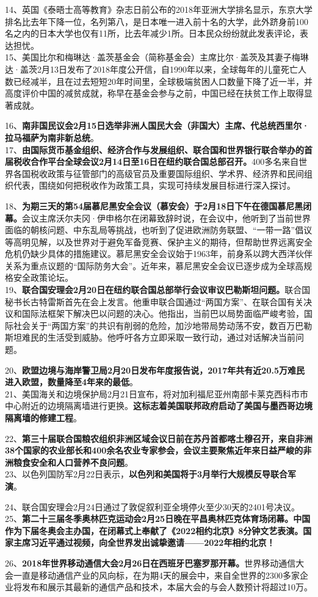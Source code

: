 14、英国《泰晤士高等教育》杂志日前公布的2018年亚洲大学排名显示，东京大学排名比去年下降一位，名列第八，是日本唯一进入前十名的大学，此外跻身前100名之内的日本大学也仅有11所，比去年减少1所。日本民众纷纷就此发表评论，表达担忧。\\
15、美国比尔和梅琳达·盖茨基金会（简称基金会）主席比尔·盖茨及其妻子梅琳达·盖茨2月13日发布了2018年度公开信，自1990年以来，全球每年的儿童死亡人数已经减半，且在过去短短20年时间里，全球极端贫困人口数量下降了近一半，并高度评价中国的减贫成就，称早在基金会参与之前，中国已经在扶贫工作上取得显著成就。

16、{\textbf{南非国民议会2月15日选举非洲人国民大会（非国大）主席、代总统西里尔·拉马福萨为南非新总统}}。\\
17、{\textbf{由国际货币基金组织、经济合作与发展组织、联合国和世界银行联合举办的首届税收合作平台全球会议2月14日至16日在纽约联合国总部召开。}}400多名来自世界各国税收政策与征管部门的高级官员及重要国际组织、学术界、经济界和民间组织代表，围绕如何把税收作为政策工具，实现可持续发展目标进行深入探讨。

18、{\textbf{为期三天的第54届慕尼黑安全会议（慕安会）于2月18日下午在德国慕尼黑闭幕。}}会议主席沃尔夫冈·伊申格尔在闭幕致辞时说，在会议中，他听到了当前世界面临的朝核问题、中东乱局等挑战，也听到了促进欧洲防务联盟、``一带一路''倡议等高明见解，以及世界对于避免军备竞赛、保护主义的期待，但帮助世界远离安全危机仍缺少具体的措施建议。慕尼黑安全会议始于1963年，前身系以跨大西洋伙伴关系为重点议题的``国际防务大会''。近年来，慕尼黑安全会议已逐步成为全球高规格安全政策论坛。\\
19、{\textbf{联合国安理会2月20日在纽约联合国总部举行会议审议巴勒斯坦问题。}}联合国秘书长古特雷斯首先在会上发言。他重申联合国通过``两国方案''、在联合国有关决议和国际法框架下解决巴以问题的决心。他指出，当前巴以局势面临严峻考验，国际社会关于``两国方案''的共识有削弱的危险，加沙地带局势动荡不安，数百万巴勒斯坦难民的生活受到威胁。他呼吁各方立即采取一致行动，通过对话解决当前问题。

20、{\textbf{欧盟边境与海岸警卫局2月20日发布年度报告说，2017年共有近20.5万难民进入欧盟，数量降至4年来的最低}}。\\
21、美国海关和边境保护局2月21日宣布，将对加利福尼亚州南部卡莱克西科市市中心附近的边境隔离墙进行更换。{\textbf{这标志着美国联邦政府启动了美国与墨西哥边境隔离墙的修建工程}}。

22、{\textbf{第三十届联合国粮农组织非洲区域会议日前在苏丹首都喀土穆召开，来自非洲38个国家的农业部长和400余名农业专家参会，会议主要聚焦近年来日益严峻的非洲粮食安全和人口营养不良问题}}。\\
23、以色列国防军2月22日表示，{\textbf{以色列和美国将于3月举行大规模反导联合军演}}。

24、联合国安理会2月24日通过了敦促叙利亚全境停火至少30天的2401号决议。\\
25、{\textbf{第二}}{\textbf{十三届冬季奥林匹克运动会2月25日晚在平昌奥林匹克体育场闭幕。中国作为下届冬奥会主办国，在闭幕式上奉献了《2022相约北京》8分钟文艺表演。国家主席习近平通过视频，向全世界发出诚挚邀请------2022年相约北京！}}

26、{\textbf{201}}{\textbf{8年世界移动通信大会2月26日在西班牙巴塞罗那开幕。}}世界移动通信大会一直是移动通信产业的风向标，在为期4天的展会中，来自全世界的2300多家企业将发布和展示其最新的通信产品和技术，本届大会的与会人数预计将超过10万。
